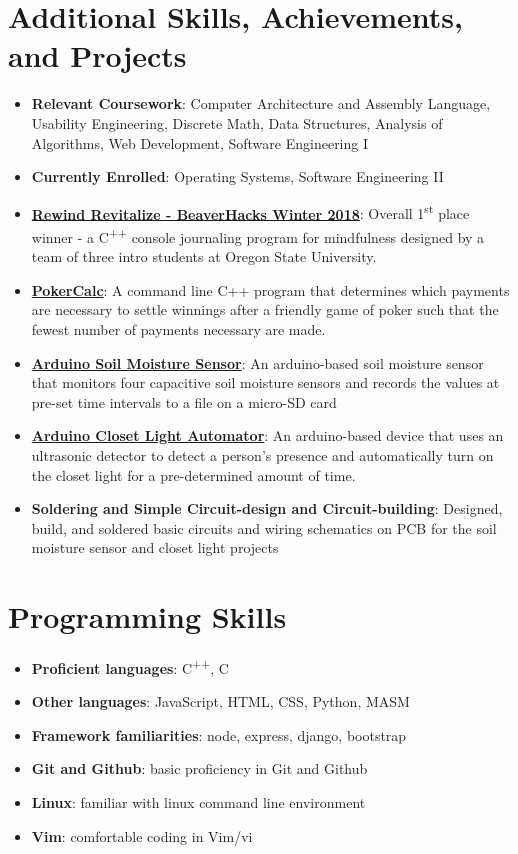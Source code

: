 \documentclass[letterpaper,11pt]{article}
\newcommand{\resumeItem}[2]{
  \item\small{
    \textbf{#1}{: #2 \vspace{-2pt}}
  }
}
\newcommand{\resumeSubItem}[2]{\resumeItem{#1}{#2}\vspace{-4pt}}
\newcommand{\resumeSubHeadingListStart}{\begin{itemize}[leftmargin=*]}
\newcommand{\resumeSubHeadingListEnd}{\end{itemize}}
\begin{document}
\section{Additional Skills, Achievements, and Projects}
  \resumeSubHeadingListStart
    \resumeSubItem{Relevant Coursework}
      {Computer Architecture and Assembly Language, Usability Engineering, Discrete Math, Data Structures, Analysis of Algorithms, Web Development, Software Engineering I}
    \resumeSubItem{Currently Enrolled}
    	{Operating Systems, Software Engineering II}
    \resumeSubItem{\href{https://github.com/jkbartos/rewind-revitalize}{Rewind Revitalize - BeaverHacks Winter 2018}}{Overall 1\textsuperscript{st} place winner - a C\textsuperscript{++} console journaling program for mindfulness designed by a team of three intro students at Oregon State University.}
    \resumeSubItem{\href{https://github.com/jordankbartos/PokerCalc}{PokerCalc}}
      {A command line C++ program that determines which payments are necessary to settle winnings after a friendly game of poker such that the fewest number of payments necessary are made.}
     \resumeSubItem{\href{https://www.github.com/jordankbartos/soil-moisture-sensor}{Arduino Soil Moisture Sensor}}{An arduino-based soil moisture sensor that monitors four capacitive soil moisture sensors and records the values at pre-set time intervals to a file on a micro-SD card}
     \resumeSubItem{\href{}{Arduino Closet Light Automator}}{An arduino-based device that uses an ultrasonic detector to detect a person's presence and automatically turn on the closet light for a pre-determined amount of time.}
     \resumeSubItem{Soldering and Simple Circuit-design and Circuit-building}{Designed, build, and soldered basic circuits and wiring schematics on PCB for the soil moisture sensor and closet light projects}

    
  \resumeSubHeadingListEnd
\hfill

\section{Programming Skills}
  \resumeSubHeadingListStart
    \resumeSubItem{Proficient languages}{ C\textsuperscript{++}, C}
    \resumeSubItem{Other languages}{JavaScript, HTML, CSS, Python, MASM}
    \resumeSubItem{Framework familiarities}{node, express, django, bootstrap}
    \resumeSubItem{Git and Github}{basic proficiency in Git and Github}
    \resumeSubItem{Linux}{familiar with linux command line environment}
    \resumeSubItem{Vim}{comfortable coding in Vim/vi}
  \resumeSubHeadingListEnd
 \hfill
\end{document}

